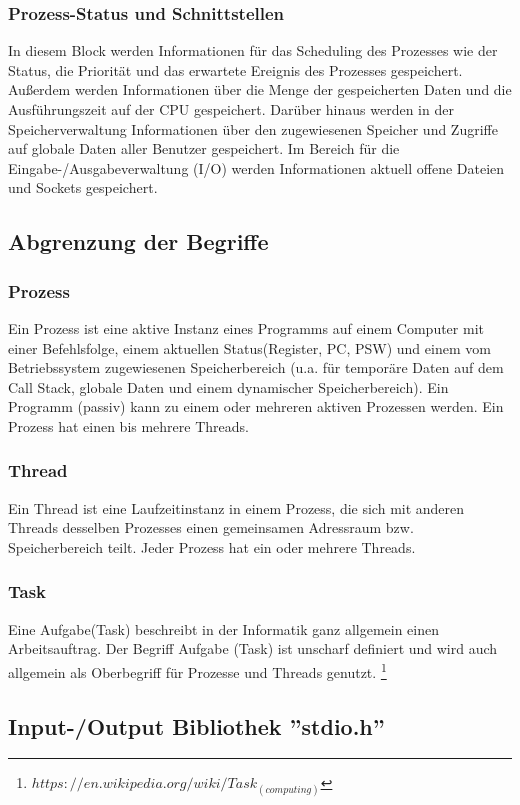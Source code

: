 \documentclass[numbers=noendperiod]{scrartcl}
\begin{document}
\subsubsection{Prozess-Status und Schnittstellen}
In diesem Block werden Informationen für das Scheduling des Prozesses wie der Status, die Priorität und das erwartete Ereignis des Prozesses gespeichert. Außerdem werden Informationen über die Menge der gespeicherten Daten und die Ausführungszeit auf der CPU gespeichert. Darüber hinaus werden in der Speicherverwaltung Informationen über den zugewiesenen Speicher und Zugriffe auf globale Daten aller Benutzer gespeichert. Im Bereich für die Eingabe-/Ausgabeverwaltung (I/O) werden Informationen aktuell offene Dateien und Sockets gespeichert.

\subsection{Abgrenzung der Begriffe}
\subsubsection*{Prozess}
Ein Prozess ist eine aktive Instanz eines Programms auf einem Computer mit einer Befehlsfolge, einem aktuellen Status(Register, PC, PSW) und einem vom Betriebssystem zugewiesenen Speicherbereich (u.a. für temporäre Daten auf dem Call Stack, globale Daten und einem dynamischer Speicherbereich). Ein Programm (passiv) kann zu einem oder mehreren aktiven Prozessen werden. Ein Prozess hat einen bis mehrere Threads.
\subsubsection*{Thread}
Ein Thread ist eine Laufzeitinstanz in einem Prozess, die sich mit anderen Threads desselben Prozesses einen gemeinsamen Adressraum bzw. Speicherbereich teilt. Jeder Prozess hat ein oder mehrere Threads. 
\subsubsection*{Task}
Eine Aufgabe(Task) beschreibt in der Informatik ganz allgemein einen Arbeitsauftrag. Der Begriff Aufgabe (Task) ist unscharf definiert und wird auch allgemein als Oberbegriff für Prozesse und Threads genutzt. \footnote{$ https://en.wikipedia.org/wiki/Task_(computing)$}

\subsection{Input-/Output Bibliothek ''stdio.h''}
\end{document}
